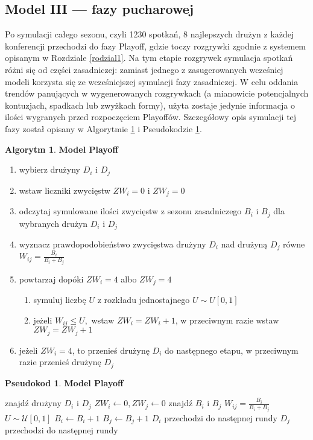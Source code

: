 \documentclass[inzynierska]{pwr_wmat_praca_dyplomowa}
\theoremstyle{plain}
\numberwithin{theorem}{chapter}
\theoremstyle{definition}
\numberwithin{theorem}{chapter}
\newtheorem{algorytm}[theorem]{Algorytm}
\newtheorem{pseudokod}[theorem]{Pseudokod}
\begin{document}
\subsection{Model III --- fazy pucharowej}
Po symulacji całego sezonu, czyli 1230 spotkań, 8 najlepszych drużyn z każdej konferencji przechodzi do fazy Playoff, gdzie toczy rozgrywki zgodnie z systemem opisanym w Rozdziale \ref{rodzial1}. Na tym etapie rozgrywek symulacja spotkań różni się od części zasadniczej: zamiast jednego z zasugerowanych wcześniej modeli korzysta się ze wcześniejszej symulacji fazy zasadniczej. W celu oddania trendów panujących w wygenerowanych rozgrywkach (a mianowicie potencjalnych kontuzjach, spadkach lub zwyżkach formy), użyta zostaje jedynie informacja o ilości wygranych przed rozpoczęciem Playoffów. Szczegółowy opis symulacji tej fazy został opisany w Algorytmie \ref{algorytm3} i Pseudokodzie \ref{pseudokod3}.

\begin{algorytm} \label{algorytm3}
	\textbf{Model Playoff}
	\begin{enumerate}
		\item wybierz drużyny $D_i$ i $D_j$
		\item wstaw liczniki zwycięstw $ZW_i=0$ i $ZW_j=0$
		\item odczytaj symulowane ilości zwycięstw z sezonu zasadniczego $B_i$ i $B_j$ dla wybranych drużyn $D_i$ i $D_j$
		\item wyznacz prawdopodobieństwo zwycięstwa drużyny $D_i$ nad drużyną $D_j$ równe $W_{ij}=\frac{B_i}{B_i + B_j}$
		\item powtarzaj dopóki  $ZW_i=4$ albo $ZW_j=4$
		\begin{enumerate}
			\item symuluj liczbę $U$ z rozkładu jednostajnego $U\sim U[0,1]$ 
			\item jeżeli $W_{ij} \leq U,$ wstaw $ZW_i=ZW_i+1$, w przeciwnym razie wstaw $ZW_j=ZW_j+1$
		\end{enumerate}
		\item jeżeli $ZW_i=4$, to przenieś drużynę $D_i$ do następnego etapu, w przeciwnym razie przenieś drużynę $D_j$
	\end{enumerate}
\end{algorytm} 

\begin{pseudokod} \label{pseudokod3} 
	\textbf{Model Playoff}
	\begin{algorithmic}[1]
		\State znajdź drużyny $D_i$ i $D_j$
		\State $ZW_i\gets 0,ZW_j\gets 0$
		\State znajdź $B_{i}$ i $B_{j}$ 
		\State $W_{ij}=\frac{B_i}{B_i + B_j}$
		\State $U\sim \mathcal{U}[0,1]$
		\State $B_i \gets B_i+1$
		\Else
		\State $B_j \gets B_j+1$
		\EndIf
		\EndWhile
		\State $D_i$ przechodzi do następnej rundy
		\Else
		\State $D_j$ przechodzi do następnej rundy
		\EndIf
	\end{algorithmic}
\end{pseudokod}
\end{document}
